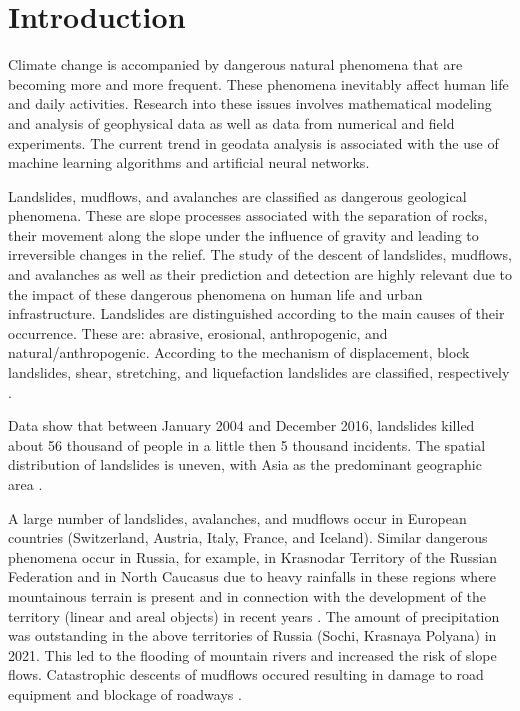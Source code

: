 \documentclass[mathematics,article,submit,pdftex,moreauthors]{Definitions/mdpi}
\begin{document}
\section{Introduction}

Climate change is accompanied by dangerous natural phenomena that are becoming more and more frequent. These phenomena inevitably affect human life and daily activities.  Research into these issues involves mathematical modeling and analysis of geophysical data as well as data from numerical and field experiments. The current trend in geodata analysis is associated with the use of machine learning algorithms and artificial neural networks.

Landslides, mudflows, and avalanches are classified as dangerous geological phenomena. These are slope processes associated with the separation of rocks, their movement along the slope under the influence of gravity and leading to irreversible changes in the relief. The study of the descent of landslides, mudflows, and avalanches as well as their prediction and detection are highly relevant due to the impact of these dangerous phenomena on human life and urban infrastructure. Landslides are distinguished according to the main causes of their occurrence. These are: abrasive, erosional, anthropogenic, and natural/anthropogenic. According to the mechanism of displacement, block landslides, shear, stretching, and liquefaction landslides are classified, respectively \cite{Pendin2015}.

Data show that between January 2004 and December 2016, landslides killed about 56 thousand of people in a little then 5 thousand incidents. The spatial distribution of landslides is uneven, with Asia as the predominant geographic area \cite{Froude2018}.

A large number of landslides, avalanches, and mudflows occur in European countries (Switzerland, Austria, Italy, France, and Iceland). Similar dangerous phenomena occur in Russia, for example, in Krasnodar Territory of the Russian Federation and in  North Caucasus due to heavy rainfalls in these regions where mountainous terrain is present and in connection with the development of the territory (linear and areal objects) in recent years \cite{hungr2005landslide}.  The amount of precipitation was outstanding in the above territories of Russia (Sochi, Krasnaya Polyana) in 2021. This led to the flooding of mountain rivers and increased the risk of slope flows. Catastrophic descents of mudflows occured resulting in damage to road equipment and blockage of roadways \cite{Harch2020}.
\end{document}
